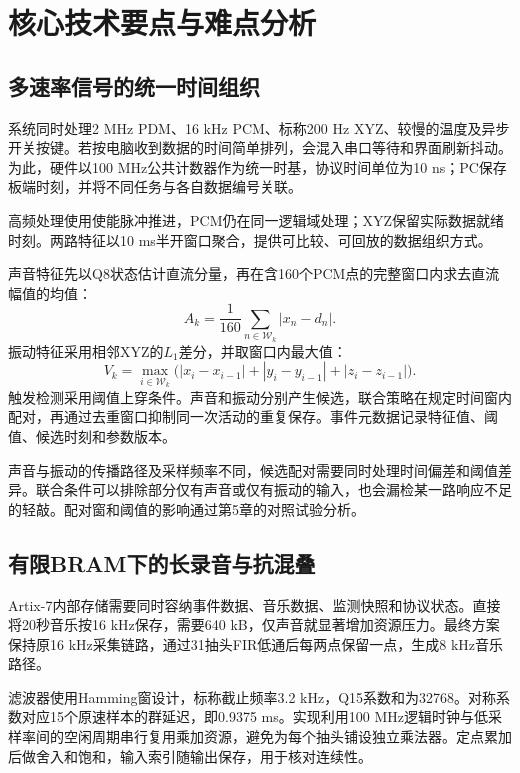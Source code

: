 \chapter{核心技术要点与难点分析}
\section{多速率信号的统一时间组织}
系统同时处理2 MHz PDM、16 kHz PCM、标称200 Hz XYZ、较慢的温度及异步开关按键。若按电脑收到数据的时间简单排列，会混入串口等待和界面刷新抖动。为此，硬件以100 MHz公共计数器作为统一时基，协议时间单位为10 ns；PC保存板端时刻，并将不同任务与各自数据编号关联。

高频处理使用使能脉冲推进，PCM仍在同一逻辑域处理；XYZ保留实际数据就绪时刻。两路特征以10 ms半开窗口聚合，提供可比较、可回放的数据组织方式。


声音特征先以Q8状态估计直流分量，再在含160个PCM点的完整窗口内求去直流幅值的均值：
\begin{equation}
 A_k=\frac{1}{160}\sum_{n\in\mathcal W_k}|x_n-d_n|.
\end{equation}
振动特征采用相邻XYZ的$L_1$差分，并取窗口内最大值：
\begin{equation}
 V_k=\max_{i\in\mathcal W_k}\bigl(|x_i-x_{i-1}|+|y_i-y_{i-1}|+|z_i-z_{i-1}|\bigr).
\end{equation}
触发检测采用阈值上穿条件。声音和振动分别产生候选，联合策略在规定时间窗内配对，再通过去重窗口抑制同一次活动的重复保存。事件元数据记录特征值、阈值、候选时刻和参数版本。

声音与振动的传播路径及采样频率不同，候选配对需要同时处理时间偏差和阈值差异。联合条件可以排除部分仅有声音或仅有振动的输入，也会漏检某一路响应不足的轻敲。配对窗和阈值的影响通过第5章的对照试验分析。

\section{有限BRAM下的长录音与抗混叠}
Artix-7内部存储需要同时容纳事件数据、音乐数据、监测快照和协议状态。直接将20秒音乐按16 kHz保存，需要640 kB，仅声音就显著增加资源压力。最终方案保持原16 kHz采集链路，通过31抽头FIR低通后每两点保留一点，生成8 kHz音乐路径。

滤波器使用Hamming窗设计，标称截止频率3.2 kHz，Q15系数和为32768。对称系数对应15个原速样本的群延迟，即0.9375 ms。实现利用100 MHz逻辑时钟与低采样率间的空闲周期串行复用乘加资源，避免为每个抽头铺设独立乘法器。定点累加后做舍入和饱和，输入索引随输出保存，用于核对连续性。

